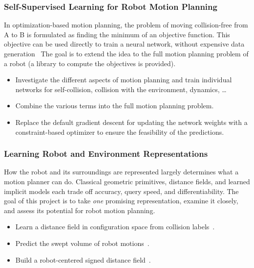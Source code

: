 \documentclass[a4paper]{article}
\begin{document}
\subsubsection{Self-Supervised Learning for Robot Motion Planning}
In optimization-based motion planning, the problem of moving collision-free from A to B is formulated as finding the minimum of an objective function.
This objective can be used directly to train a neural network, without expensive data generation~\cite{Pandy2021unsupervised} 
The goal is to extend the idea to the full motion planning problem of a robot (a library to compute the objectives is provided).
\begin{itemize}
  \item Investigate the different aspects of motion planning and train individual networks for self-collision, collision with the environment, dynamics, \dots
  \item Combine the various terms into the full motion planning problem.
  \item Replace the default gradient descent for updating the network weights with a constraint-based optimizer to ensure the feasibility of the predictions.
\end{itemize}

\subsubsection{Learning Robot and Environment Representations}
    How the robot and its surroundings are represented largely determines what a motion planner can do.
    Classical geometric primitives, distance fields, and learned implicit models each trade off accuracy, query speed, and differentiability.
    The goal of this project is to take \emph{one} promising representation, examine it closely, and assess its potential for robot motion planning.
    \begin{itemize}
        \item Learn a distance field in configuration space from collision labels~\cite{Zheng2026cosdf}.
        \item Predict the swept volume of robot motions~\cite{Baxter2020SweptVolume}.
        \item Build a robot-centered signed distance field~\cite{Liu2023linkSDF}.
    \end{itemize}
\end{document}
